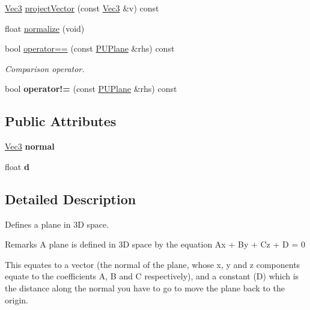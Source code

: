 \begin{DoxyCompactItemize}
\item 
\hyperlink{classVec3}{Vec3} \hyperlink{classPUPlane_a7e389950f054b35612eeb8d03651fffe}{project\+Vector} (const \hyperlink{classVec3}{Vec3} \&v) const
\item 
float \hyperlink{classPUPlane_a3fdd7310db1b718bc70fe3cac8714f2e}{normalize} (void)
\item 
\mbox{\label{classPUPlane_a19cf56a14747ea1a4c3a82e3bbaf9782}} 
bool \hyperlink{classPUPlane_a19cf56a14747ea1a4c3a82e3bbaf9782}{operator==} (const \hyperlink{classPUPlane}{P\+U\+Plane} \&rhs) const
\begin{DoxyCompactList}\small\item\em Comparison operator. \end{DoxyCompactList}\item 
\mbox{\label{classPUPlane_a5c3e931b0efda77fec78780ca06a096e}} 
bool {\bfseries operator!=} (const \hyperlink{classPUPlane}{P\+U\+Plane} \&rhs) const
\end{DoxyCompactItemize}
\subsection*{Public Attributes}
\begin{DoxyCompactItemize}
\item 
\mbox{\label{classPUPlane_a4147627f89b9aee2a9b977618265f449}} 
\hyperlink{classVec3}{Vec3} {\bfseries normal}
\item 
\mbox{\label{classPUPlane_aba3a0dbd72909bdae9288f7ba2160cd2}} 
float {\bfseries d}
\end{DoxyCompactItemize}


\subsection{Detailed Description}
Defines a plane in 3D space. \begin{DoxyRemark}{Remarks}
A plane is defined in 3D space by the equation Ax + By + Cz + D = 0 
\end{DoxyRemark}
\begin{DoxyParagraph}{}
This equates to a vector (the normal of the plane, whose x, y and z components equate to the coefficients A, B and C respectively), and a constant (D) which is the distance along the normal you have to go to move the plane back to the origin. 
\end{DoxyParagraph}


